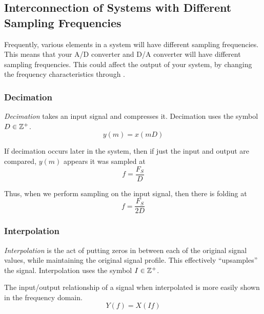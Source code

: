 \subsection{Interconnection of Systems with Different Sampling Frequencies}\label{subsec:Interconnect_Different_Sampling_Frequency}
Frequently, various elements in a system will have different sampling frequencies.
This means that your A/D converter and D/A converter will have different sampling frequencies.
This could affect the output of your system, by changing the frequency characteristics through .

\subsubsection{Decimation}\label{subsubsec:Decimation}
\begin{definition}[Decimation]\label{def:Decimation}
  \emph{Decimation} takes an input signal and compresses it.
  Decimation uses the symbol $D \in \operatorname{\mathbb{Z}^{+}}$.
  \begin{equation*}
    y(m) = x(mD)
  \end{equation*}

  If decimation occurs later in the system, then if just the input and output are compared, $y(m)$ appears it was sampled at
  \begin{equation}\label{eq:Input_Output_Decimation}
    f = \frac{F_{S}}{D}
  \end{equation}
  
  Thus, when we perform sampling on the input signal, then there is folding at
  \begin{equation}\label{eq:Decimation_Sampling_Frequency_Change}
    f = \frac{F_{S}}{2D}
  \end{equation}
\end{definition}

\subsubsection{Interpolation}\label{subsubsec:Interpolation}
\begin{definition}[Interpolation]\label{def:Interpolation}
  \emph{Interpolation} is the act of putting zeros in between each of the original signal values, while maintaining the original signal profile.
  This effectively ``upsamples'' the signal.
  Interpolation uses the symbol $I \in \operatorname{\mathbb{Z}^{+}}$.

  The input/output relationship of a signal when interpolated is more easily shown in the frequency domain.
  \begin{equation}\label{eq:Interpolation}
    Y(f) = X(If)
  \end{equation}
\end{definition}

